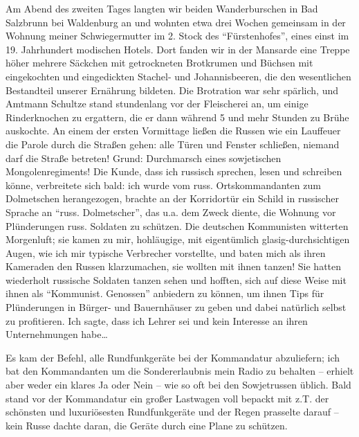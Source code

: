 \documentclass[a5paper,pagesize,10pt,twoside=true]{scrbook}
\renewcommand{\marginpar}[2][]{}
\begin{document}
\marginpar{80, Bad Lauterberg ab 19.2.77} Am Abend des zweiten Tages langten wir beiden Wanderburschen in Bad Salzbrunn bei Waldenburg an und wohnten etwa drei Wochen gemeinsam in der Wohnung meiner Schwiegermutter im 2. Stock des \enquote{Fürstenhofes}, eines einst im 19. Jahrhundert modischen Hotels. Dort fanden wir in der Mansarde eine Treppe höher mehrere Säckchen mit getrockneten Brotkrumen und Büchsen mit eingekochten und eingedickten Stachel- und Johannisbeeren, die den wesentlichen Bestandteil unserer Ernährung bildeten. Die Brotration war sehr spärlich, und Amtmann Schultze stand stundenlang vor der Fleischerei an, um einige Rinderknochen zu ergattern, die er dann während 5 und mehr Stunden zu Brühe auskochte. An einem der ersten Vormittage ließen die Russen wie ein Lauffeuer die Parole durch die Straßen gehen: alle Türen und Fenster schließen, niemand darf die Straße betreten! Grund: Durchmarsch eines sowjetischen Mongolenregiments! Die Kunde, dass ich russisch sprechen, lesen und schreiben könne, verbreitete sich bald: ich wurde vom russ. Ortskommandanten zum Dolmetschen herangezogen, brachte an der Korridortür ein Schild in russischer Sprache an \enquote{russ. Dolmetscher}, das u.a. dem \marginpar{81} Zweck diente, die Wohnung vor Plünderungen russ. Soldaten zu schützen. Die deutschen Kommunisten witterten Morgenluft; sie kamen zu mir, hohläugige, mit eigentümlich glasig-durchsichtigen Augen, wie ich mir typische Verbrecher vorstellte, und baten mich als ihren Kameraden den Russen klarzumachen, sie wollten mit ihnen tanzen! Sie hatten wiederholt russische Soldaten tanzen sehen und hofften, sich auf diese Weise mit ihnen als \enquote{Kommunist. Genossen} anbiedern zu können, um ihnen Tips für Plünderungen in Bürger- und Bauernhäuser zu geben und dabei natürlich selbst zu profitieren. Ich sagte, dass ich Lehrer sei und kein Interesse an ihren Unternehmungen habe\dots

Es kam der Befehl, alle Rundfunkgeräte bei der Kommandatur abzuliefern; ich bat den Kommandanten um die Sondererlaubnis mein Radio zu behalten -- erhielt aber weder ein klares Ja oder Nein -- wie so oft bei den Sowjetrussen üblich. Bald stand vor der Kommandatur ein großer Lastwagen voll bepackt mit z.T. der schönsten und luxuriösesten Rundfunkgeräte und der Regen prasselte darauf -- kein Russe dachte daran, die Geräte durch eine Plane zu schützen.
\end{document}
